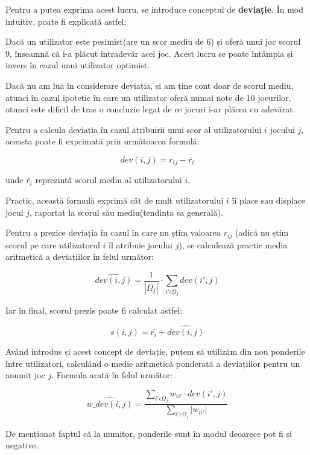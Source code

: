 \documentclass[12pt,a4paper]{report}
\begin{document}
Pentru a putea exprima acest lucru, se introduce conceptul de \textbf{deviație}. În mod intuitiv, poate fi explicată astfel:

\bigskip

Dacă un utilizator este pesimist(are un scor mediu de 6) și oferă unui joc scorul 9, înseamnă că i-a plăcut întradevăr acel joc. Acest lucru se poate întâmpla și invers în cazul unui utilizator optimist.

Dacă nu am lua în considerare deviația, și am ține cont doar de scorul mediu, atunci în cazul ipotetic în care un utilizator oferă numai note de 10 jocurilor, atunci este dificil de tras o concluzie legat de ce jocuri i-ar plăcea cu adevărat.

\bigskip

Pentru a calcula deviația în cazul atribuirii unui scor al utilizatorului \( i \) jocului \( j \), aceasta poate fi exprimată prin următoarea formulă:

\[ dev(i,j) = r_{ij} - \overline{r_{i}} \]

unde \( \overline{r_{i}}\) reprezintă scorul mediu al utilizatorului \( i \).

Practic, această formulă exprimă cât de mult utilizatorului \( i \) îi place sau displace jocul \( j \), raportat la scorul său mediu(tendința sa generală).

Pentru a prezice deviația în cazul în care nu știm valoarea \( r_{ij}\) (adică nu știm scorul pe care utilizatorul \( i \) îl atribuie jocului \( j \)), se calculează practic media aritmetică a deviațiilor în felul următor:

\[ \hat{dev(i,j)} = \frac{1}{|\Omega_{j}|} \cdot \sum\limits_{i' \epsilon \Omega_{j} } dev(i', j) \] 

Iar în final, scorul prezis poate fi calculat astfel:

\[ s(i,j) = \overline{r_i} + \hat{dev(i,j)} \]

\bigskip

Având introdus și acest concept de deviație, putem să utilizăm din nou ponderile între utilizatori, calculând o medie aritmetică ponderată a deviațiilor pentru un anumit joc \( j \). Formula arată în felul următor:

\[ \hat{w\_dev(i,j)} = \dfrac{ \sum\limits_{i' \epsilon \Omega_{j} } w_{ii'} \cdot dev(i', j) }{\sum\limits_{i' \epsilon \Omega_{j}} |w_{ii'}|} \]

De menționat faptul că la numitor, ponderile sunt în modul deoarece pot fi și negative.
\end{document}
